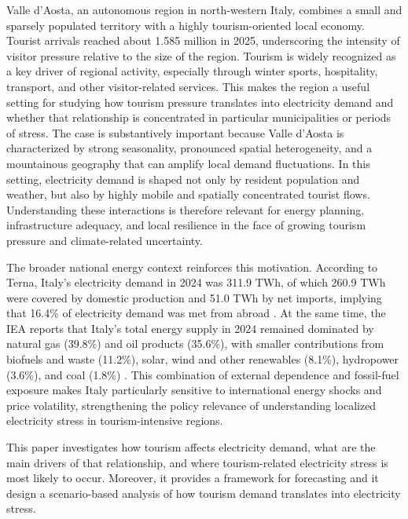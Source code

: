 \documentclass[11pt,a4paper]{article}
\begin{document}
Valle d'Aosta, an autonomous region in north-western Italy, combines a 
small and sparsely populated 
territory with a highly tourism-oriented local economy. 
Tourist arrivals reached about 1.585 million in 2025, underscoring the 
intensity of visitor pressure relative to the size of the region.
Tourism is widely recognized as a key driver of regional activity, 
especially through winter sports, hospitality, transport,
and other visitor-related services. 
This makes the region a useful setting for studying 
how tourism pressure translates into electricity demand and 
whether that relationship is concentrated in particular 
municipalities or periods of stress.
\noindent
\hangindent=-5mm
The case is substantively important because Valle d'Aosta is characterized
by strong seasonality, pronounced spatial heterogeneity, 
and a mountainous geography that can amplify local demand fluctuations. 
In this setting, electricity demand is shaped not only by resident population 
and weather, but also by highly mobile and spatially concentrated tourist flows. 
Understanding these interactions is therefore relevant for energy planning,
infrastructure adequacy, and local resilience in the face 
of growing tourism pressure and climate-related uncertainty.

\noindent
\hangindent=-5mm
The broader national energy context reinforces this motivation. 
According to Terna, Italy's electricity demand in 2024 was 311.9 TWh, 
of which 260.9 TWh were covered by domestic 
production and 51.0 TWh by net imports, implying that 16.4\% of electricity 
demand was met from abroad \citep{terna2024stats}. At the same time, the IEA reports that Italy's total 
energy supply in 2024 remained dominated by natural gas (39.8\%) and oil products (35.6\%), 
with smaller contributions from biofuels and waste (11.2\%), solar, 
wind and other renewables (8.1\%), hydropower (3.6\%), and coal (1.8\%) \citep{iea2025italy}.
This combination of external dependence and fossil-fuel exposure makes Italy particularly sensitive to 
international energy shocks and price volatility, strengthening the policy relevance of understanding 
localized electricity stress in tourism-intensive regions.

\noindent
\hangindent=-5mm
This paper investigates how tourism affects electricity demand, what are
the main drivers of that relationship, and where tourism-related electricity stress is most likely to occur.
Moreover, it provides a framework for forecasting and it design a scenario-based analysis of 
how tourism demand translates into electricity stress.
\end{document}
